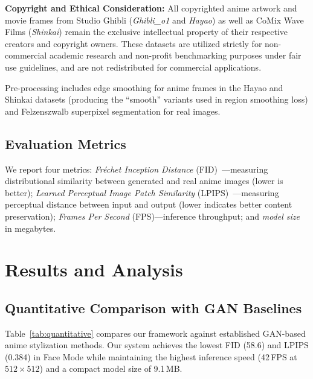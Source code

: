 \documentclass[journal]{IEEEtran}
\begin{document}
\textbf{Copyright and Ethical Consideration:} All copyrighted anime artwork and movie frames from Studio Ghibli (\textit{Ghibli\_o1} and \textit{Hayao}) as well as CoMix Wave Films (\textit{Shinkai}) remain the exclusive intellectual property of their respective creators and copyright owners. These datasets are utilized strictly for non-commercial academic research and non-profit benchmarking purposes under fair use guidelines, and are not redistributed for commercial applications.

Pre-processing includes edge smoothing for anime frames in the Hayao and Shinkai datasets (producing the ``smooth'' variants used in region smoothing loss) and Felzenszwalb superpixel segmentation for real images.

\subsection{Evaluation Metrics}

We report four metrics: \textit{Fr\'{e}chet Inception Distance} (FID)~\cite{Heusel2017}---measuring distributional similarity between generated and real anime images (lower is better); \textit{Learned Perceptual Image Patch Similarity} (LPIPS)~\cite{Zhang2018LPIPS}---measuring perceptual distance between input and output (lower indicates better content preservation); \textit{Frames Per Second} (FPS)---inference throughput; and \textit{model size} in megabytes.


\section{Results and Analysis}
\label{sec:results}

\subsection{Quantitative Comparison with GAN Baselines}

Table~\ref{tab:quantitative} compares our framework against established GAN-based anime stylization methods. Our system achieves the lowest FID (58.6) and LPIPS (0.384) in Face Mode while maintaining the highest inference speed (42\,FPS at $512 \times 512$) and a compact model size of 9.1\,MB.
\end{document}
